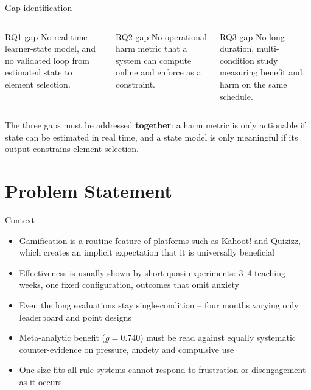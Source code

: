 \documentclass[10pt]{beamer}
\begin{document}
\begin{frame}{Gap identification}
\begin{columns}[T]
    \begin{alertblock}{RQ1 gap}
        No real-time learner-state model, and no validated loop from estimated state to element
        selection.
    \end{alertblock}
    \begin{alertblock}{RQ2 gap}
        No operational harm metric that a system can compute online and enforce as a constraint.
    \end{alertblock}
    \begin{alertblock}{RQ3 gap}
        No long-duration, multi-condition study measuring benefit and harm on the same schedule.
    \end{alertblock}
\end{columns}
\vspace{0.3cm}
\begin{keybox}
The three gaps must be addressed \textbf{together}: a harm metric is only actionable if state
can be estimated in real time, and a state model is only meaningful if its output constrains
element selection.
\end{keybox}
\end{frame}


\section{Problem Statement}

\begin{frame}{Context}
\begin{itemize}
    \item Gamification is a routine feature of platforms such as Kahoot! and Quizizz, which
    creates an implicit expectation that it is universally beneficial \cite{nugroho2025negative}
    \item Effectiveness is usually shown by short quasi-experiments: 3--4 teaching weeks, one
    fixed configuration, outcomes that omit anxiety \cite{zhang2026gamification,ojonuba2025web}
    \item Even the long evaluations stay single-condition -- four months varying only leaderboard
    and point designs \cite{durmaz2022gamification}
    \item Meta-analytic benefit ($g = 0.740$) must be read against equally systematic
    counter-evidence on pressure, anxiety and compulsive use
    \item One-size-fits-all rule systems cannot respond to frustration or disengagement as it
    occurs \cite{farhan2023machine,shabadurai2025reinforcement,naseer2025game}
\end{itemize}
\end{frame}
\end{document}
